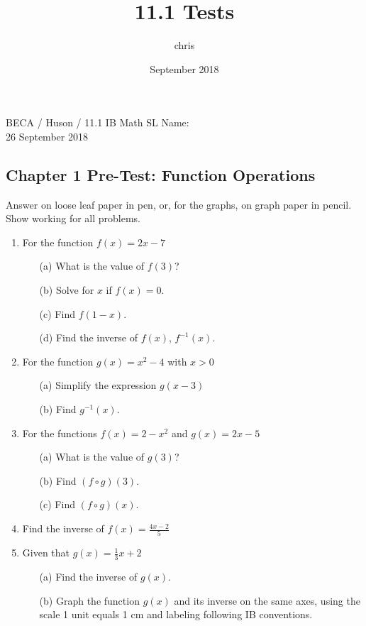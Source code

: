 \documentclass{article}
\title{11.1 Tests}
\author{chris }
\date{September 2018}
\begin{document}
\noindent BECA / Huson / 11.1 IB Math SL \qquad \qquad Name:\\
26 September 2018
\subsection*{Chapter 1 Pre-Test: Function Operations}
Answer on loose leaf paper in pen, or, for the graphs, on graph paper in pencil. Show working for all problems.

\begin{enumerate}

\item For the function $f(x) = 2x-7$
\begin{itemize}
    \item[(a)] What is the value of $f(3)$?
	\item[(b)] Solve for $x$ if $f(x)=0$.
	\item[(c)] Find  $f(1-x)$.
	\item[(d)] Find the inverse of $f(x)$,  $f^{-1}(x)$.
\end{itemize}

\item For the function $g(x) = x^2-4$ with $x>0$
\begin{itemize}
    \item[(a)] Simplify the expression $g(x-3)$
	\item[(b)] Find  $g^{-1}(x)$.
\end{itemize}

\item For the functions $f(x) = 2-x^2$ and $g(x) = 2x-5$
\begin{itemize}
    \item[(a)] What is the value of $g(3)$?
	\item[(b)] Find $(f\circ g)(3)$.
	\item[(c)] Find $(f\circ g)(x)$.
\end{itemize}

\item Find the inverse of $\displaystyle f(x)= \frac {4x-2}{5}$

\item Given that $g(x) = \frac {1}{3} x+2$
\begin{itemize}
    \item[(a)] Find the inverse of $g(x)$.
	\item[(b)] Graph the function $g(x)$ and its inverse on the same axes, using the scale 1 unit equals 1 cm and labeling following IB conventions.
\end{itemize}


\end{enumerate}
\end{document}
